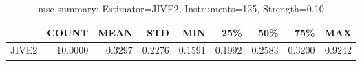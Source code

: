 \begin{table}[ht]
\centering
\caption{mse summary: Estimator=JIVE2, Instruments=125, Strength=0.10}
\begin{tabular}{lrrrrrrrr}
\toprule
 & COUNT & MEAN & STD & MIN & 25\% & 50\% & 75\% & MAX \\
\midrule
JIVE2 & 10.0000 & 0.3297 & 0.2276 & 0.1591 & 0.1992 & 0.2583 & 0.3200 & 0.9242 \\
\bottomrule
\end{tabular}
\end{table}
